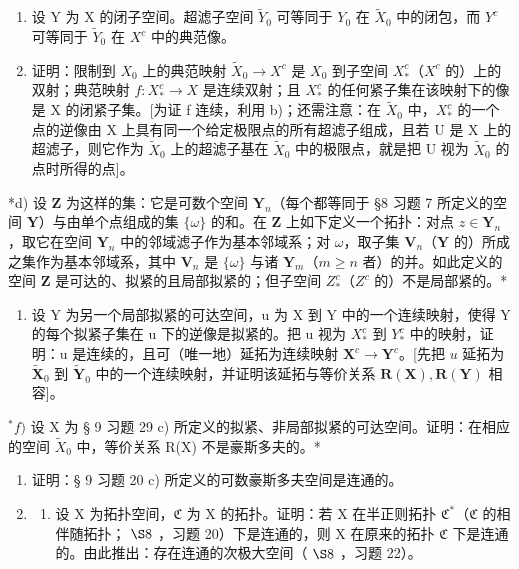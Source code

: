 \begin{enumerate}
\def\labelenumi{\alph{enumi})}
\setcounter{enumi}{1}
\item
  设 Y 为 X 的闭子空间。超滤子空间 \(\tilde{Y}_{0}\) 可等同于 \(Y_{0}\) 在 \(\tilde{X}_{0}\) 中的闭包，而 \(Y^{c}\) 可等同于 \(\tilde{Y}_{0}\) 在 \(X^{c}\) 中的典范像。
\item
  证明：限制到 \(X_{0}\) 上的典范映射 \(\tilde{X}_{0} \rightarrow X^{c}\) 是 \(X_{0}\) 到子空间 \(X_{*}^{c}\)（\(X^{c}\) 的）上的双射；典范映射 \(f: X_{*}^{c} \rightarrow X\) 是连续双射；且 \(X_{*}^{c}\) 的任何紧子集在该映射下的像是 X 的闭紧子集。{[}为证 f 连续，利用 b)；还需注意：在 \(\tilde{X}_{0}\) 中，\(X_{*}^{c}\) 的一个点的逆像由 X 上具有同一个给定极限点的所有超滤子组成，且若 U 是 X 上的超滤子，则它作为 \(\tilde{X}_{0}\) 上的超滤子基在 \(\tilde{X}_{0}\) 中的极限点，就是把 U 视为 \(\tilde{X}_{0}\) 的点时所得的点{]}。
\end{enumerate}

*d) 设 \(\mathbf{Z}\) 为这样的集：它是可数个空间 \(\mathbf{Y}_n\)（每个都等同于 §8 习题 7 所定义的空间 \(\mathbf{Y}\)）与由单个点组成的集 \(\{\omega\}\) 的和。在 \(\mathbf{Z}\) 上如下定义一个拓扑：对点 \(z \in \mathbf{Y}_n\)，取它在空间 \(\mathbf{Y}_n\) 中的邻域滤子作为基本邻域系；对 \(\omega\)，取子集 \(\mathbf{V}_n\)（\(\mathbf{Y}\) 的）所成之集作为基本邻域系，其中 \(\mathbf{V}_n\) 是 \(\{\omega\}\) 与诸 \(\mathbf{Y}_m\)（\(m \geqslant n\) 者）的并。如此定义的空间 \(\mathbf{Z}\) 是可达的、拟紧的且局部拟紧的；但子空间 \(Z_*^c\)（\(Z^c\) 的）不是局部紧的。*

\begin{enumerate}
\def\labelenumi{\alph{enumi})}
\setcounter{enumi}{4}
\tightlist
\item
  设 Y 为另一个局部拟紧的可达空间，u 为 X 到 Y 中的一个连续映射，使得 Y 的每个拟紧子集在 u 下的逆像是拟紧的。把 u 视为 \(X_{*}^{c}\) 到 \(Y_{*}^{c}\) 中的映射，证明：u 是连续的，且可（唯一地）延拓为连续映射 \(\mathbf{X}^c\to \mathbf{Y}^c\)。{[}先把 \(u\) 延拓为 \(\tilde{\mathbf{X}}_0\) 到 \(\tilde{\mathbf{Y}}_0\) 中的一个连续映射，并证明该延拓与等价关系 \(\mathbf{R}(\mathbf{X}),\mathbf{R}(\mathbf{Y})\) 相容{]}。
\end{enumerate}

\(^{*}f)\) 设 X 为 § 9 习题 29 c) 所定义的拟紧、非局部拟紧的可达空间。证明：在相应的空间 \(\tilde{X}_{0}\) 中，等价关系 R(X) 不是豪斯多夫的。*

\BourbakiExerciseGroup

\begin{enumerate}
\def\labelenumi{\arabic{enumi})}
\item
  证明：§ 9 习题 20 c) 所定义的可数豪斯多夫空间是连通的。
\item
  \begin{enumerate}
  \def\labelenumii{\alph{enumii})}
  \tightlist
  \item
    设 X 为拓扑空间，\(\mathfrak{C}\) 为 X 的拓扑。证明：若 X 在半正则拓扑 \(\mathfrak{C}^*\)（\(\mathfrak{C}\) 的相伴随拓扑； \(\S 8\) ，习题 20）下是连通的，则 X 在原来的拓扑 \(\mathfrak{C}\) 下是连通的。由此推出：存在连通的次极大空间（ \(\S 8\) ，习题 22）。
  \end{enumerate}
\end{enumerate}

